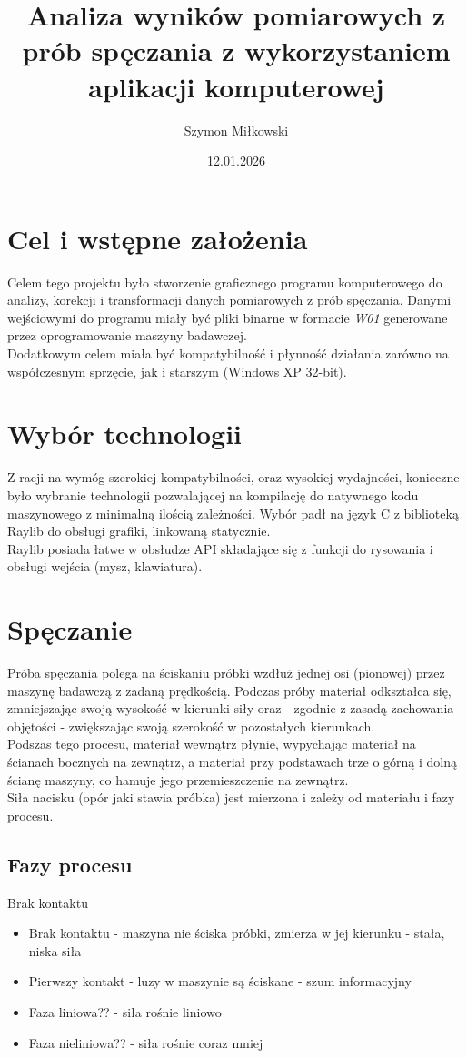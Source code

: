 \documentclass{article}
\title{Analiza wyników pomiarowych z prób spęczania z wykorzystaniem aplikacji komputerowej}
\date{12.01.2026}
\author{Szymon Miłkowski}
\begin{document}
	\maketitle
	
	\section{Cel i wstępne założenia}
	Celem tego projektu było stworzenie graficznego programu komputerowego do analizy, korekcji i transformacji danych pomiarowych z prób spęczania. Danymi wejściowymi do programu miały być pliki binarne w formacie \textit{W01} generowane przez oprogramowanie maszyny badawczej. \\
	Dodatkowym celem miała być kompatybilność i płynność działania zarówno na współczesnym sprzęcie, jak i starszym (Windows XP 32-bit).

	\section{Wybór technologii}
	Z racji na wymóg szerokiej kompatybilności, oraz wysokiej wydajności, konieczne było wybranie technologii pozwalającej na kompilację do natywnego kodu maszynowego z minimalną ilością zależności.
	Wybór padł na język C z biblioteką Raylib do obsługi grafiki, linkowaną statycznie.\\
	Raylib posiada łatwe w obsłudze API składające się z funkcji do rysowania i obsługi wejścia (mysz, klawiatura).
	
	\section{Spęczanie}
	Próba spęczania polega na ściskaniu próbki wzdłuż jednej osi (pionowej) przez maszynę badawczą z zadaną prędkością. Podczas próby materiał odkształca się, zmniejszając swoją wysokość w kierunki siły oraz - zgodnie z zasadą zachowania objętości - zwiększając swoją szerokość w pozostałych kierunkach. \\
	Podszas tego procesu, materiał wewnątrz płynie, wypychając materiał na ścianach bocznych na zewnątrz, a materiał przy podstawach trze o górną i dolną ścianę maszyny, co hamuje jego przemieszczenie na zewnątrz. \\
	Siła nacisku (opór jaki stawia próbka) jest mierzona i zależy od materiału i fazy procesu.
	
	\subsection{Fazy procesu}
	Brak kontaktu
	\begin{itemize}
		\item Brak kontaktu - maszyna nie ściska próbki, zmierza w jej kierunku - stała, niska siła
		\item Pierwszy kontakt - luzy w maszynie są ściskane - szum informacyjny
		\item Faza liniowa?? - siła rośnie liniowo
		\item Faza nieliniowa?? - siła rośnie coraz mniej
	\end{itemize}
	
\end{document}
